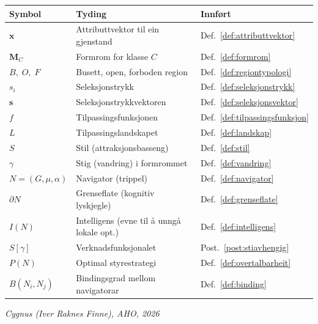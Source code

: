 \documentclass[11pt, a4paper]{article}
\theoremstyle{definition}
\theoremstyle{plain}
\theoremstyle{remark}
\newcommand{\MC}{\mathbf{M}_C}
\newcommand{\x}{\mathbf{x}}
\newcommand{\svec}{\mathbf{s}}
\begin{document}
\begin{center}
\begin{longtable}{@{}lll@{}}
\toprule
\textbf{Symbol} & \textbf{Tyding} & \textbf{Innf\o rt} \\
\midrule
\endhead
$\x$                    & Attributtvektor til ein gjenstand
                        & Def.~\ref{def:attributtvektor} \\[3pt]
$\MC$                   & Formrom for klasse $C$
                        & Def.~\ref{def:formrom} \\[3pt]
$B,\; O,\; F$           & Busett, open, forboden region
                        & Def.~\ref{def:regiontypologi} \\[3pt]
$s_i$                   & Seleksjonstrykk
                        & Def.~\ref{def:seleksjonstrykk} \\[3pt]
$\svec$                 & Seleksjonstrykkvektoren
                        & Def.~\ref{def:seleksjonsvektor} \\[3pt]
$f$                     & Tilpassingsfunksjonen
                        & Def.~\ref{def:tilpassingsfunksjon} \\[3pt]
$L$                     & Tilpassingslandskapet
                        & Def.~\ref{def:landskap} \\[3pt]
$S$                     & Stil (attraksjonsbasseng)
                        & Def.~\ref{def:stil} \\[3pt]
$\gamma$                & Stig (vandring) i formrommet
                        & Def.~\ref{def:vandring} \\[3pt]
$N = (G, \mu, \alpha)$  & Navigator (trippel)
                        & Def.~\ref{def:navigator} \\[3pt]
$\partial N$            & Grenseflate (kognitiv lyskjegle)
                        & Def.~\ref{def:grenseflate} \\[3pt]
$I(N)$                  & Intelligens (evne til \aa{} unng\aa{} lokale opt.)
                        & Def.~\ref{def:intelligens} \\[3pt]
$S[\gamma]$             & Verknadsfunksjonalet
                        & Post.~\ref{post:stiavhengig} \\[3pt]
$P(N)$                  & Optimal styrestrategi
                        & Def.~\ref{def:overtalbarheit} \\[3pt]
$B(N_i, N_j)$           & Bindingsgrad mellom navigatorar
                        & Def.~\ref{def:binding} \\
\bottomrule
\end{longtable}
\end{center}

\bigskip
\begin{center}
\textit{Cygnus (Iver Raknes Finne), AHO, 2026}
\end{center}



\end{document}

